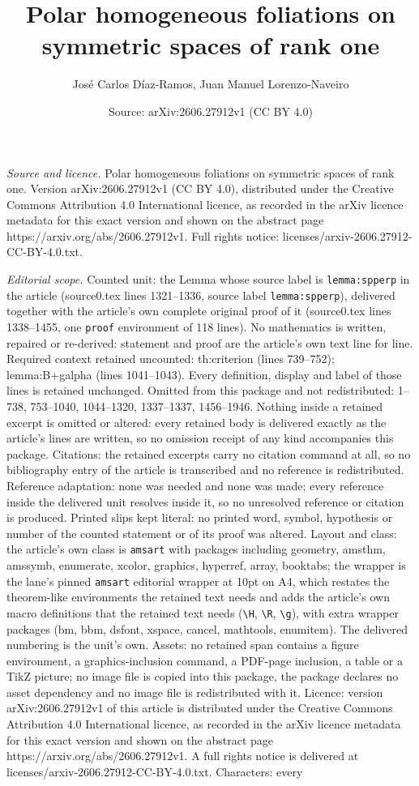\documentclass[10pt,a4paper]{amsart}
\title[Polar homogeneous foliations on symmetric spaces of rank one]{Polar homogeneous foliations on symmetric spaces of rank one}
\author{Jos\'e Carlos D\'iaz-Ramos, Juan Manuel Lorenzo-Naveiro}
\date{Source: arXiv:2606.27912v1 (CC BY 4.0)}
\begin{document}
\maketitle

\noindent\emph{Source and licence.} Polar homogeneous foliations on symmetric spaces of rank one. Version arXiv:2606.27912v1 (CC BY 4.0), distributed under the Creative Commons Attribution 4.0 International licence, as recorded in the arXiv licence metadata for this exact version and shown on the abstract page https://arxiv.org/abs/2606.27912v1. Full rights notice: licenses/arxiv-2606.27912-CC-BY-4.0.txt.\par\smallskip

\noindent\textit{Editorial scope.} Counted unit: the Lemma whose source label is \texttt{lemma:spperp} in the article (source0.tex lines 1321--1336, source label \texttt{lemma:spperp}), delivered together with the article's own complete original proof of it (source0.tex lines 1338--1455, one \texttt{proof} environment of 118 lines). No mathematics is written, repaired or re-derived: statement and proof are the article's own text line for line. Required context retained uncounted: th:criterion (lines 739--752); lemma:B+galpha (lines 1041--1043). Every definition, display and label of those lines is retained unchanged. Omitted from this package and not redistributed: 1--738, 753--1040, 1044--1320, 1337--1337, 1456--1946. Nothing inside a retained excerpt is omitted or altered: every retained body is delivered exactly as the article's lines are written, so no omission receipt of any kind accompanies this package. Citations: the retained excerpts carry no citation command at all, so no bibliography entry of the article is transcribed and no reference is redistributed. Reference adaptation: none was needed and none was made; every reference inside the delivered unit resolves inside it, so no unresolved reference or citation is produced. Printed slips kept literal: no printed word, symbol, hypothesis or number of the counted statement or of its proof was altered. Layout and class: the article's own class is \texttt{amsart} with packages including geometry, amsthm, amssymb, enumerate, xcolor, graphics, hyperref, array, booktabs; the wrapper is the lane's pinned \texttt{amsart} editorial wrapper at 10pt on A4, which restates the theorem-like environments the retained text needs and adds the article's own macro definitions that the retained text needs (\texttt{\textbackslash H}, \texttt{\textbackslash R}, \texttt{\textbackslash g}), with extra wrapper packages (bm, bbm, dsfont, xspace, cancel, mathtools, enumitem). The delivered numbering is the unit's own. Assets: no retained span contains a figure environment, a graphics-inclusion command, a PDF-page inclusion, a table or a TikZ picture; no image file is copied into this package, the package declares no asset dependency and no image file is redistributed with it. Licence: version arXiv:2606.27912v1 of this article is distributed under the Creative Commons Attribution 4.0 International licence, as recorded in the arXiv licence metadata for this exact version and shown on the abstract page https://arxiv.org/abs/2606.27912v1. A full rights notice is delivered at licenses/arxiv-2606.27912-CC-BY-4.0.txt. Characters: every 
\end{document}
